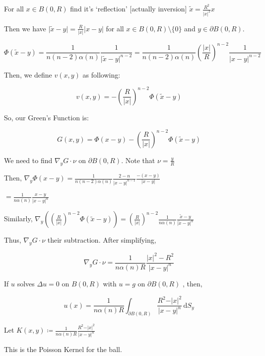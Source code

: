 \documentclass{article}
\theoremstyle{definition}
\begin{document}
For all \(x\in B(0,R)\) find it's `reflection' [actually inversion] \(\tilde{x}=\frac{R^2}{\vert x \vert ^2}x\) 

Then we have \(\vert \tilde x - y \vert = \frac{R}{\vert x \vert }\vert x-y \vert \) for all \(x\in B(0,R)\setminus \{ 0 \} \) and \(y\in \partial B(0,R)\).

\[
    \Phi(\tilde{x}-y)=\frac{1}{n(n-2)\alpha(n)}\frac{1}{\vert \tilde{x}-y \vert ^{n-2}}=\frac{1}{n(n-2)\alpha (n)}\left( \frac{\vert x \vert }{R} \right)^{n-2} \frac{1}{\vert x-y \vert ^{n-2}}
\]

Then, we define \(v(x,y)\) as following:

\[
    v(x,y)=-\left( \frac{R}{\vert x \vert } \right) ^{n-2}\Phi(\tilde x - y)
\]

So, our Green's Function is:

\[
    G(x,y)=\Phi(x-y)-\left( \frac{R}{\vert x \vert } \right)^{n-2}\Phi(\tilde x - y) 
\]

We need to find \(\nabla_y G\cdot\nu\) on \(\partial B(0,R)\). Note that \(\nu = \frac{y}{R}\) 

Then, \(\displaystyle\nabla_y\Phi(x-y)=\frac{1}{n(n-2)\alpha (n)}\frac{2-n}{\vert x-y \vert ^{n-1}}\frac{-(x-y)}{\vert x-y \vert }\) 

\(=\displaystyle \frac{1}{n \alpha (n)} \frac{x-y}{\vert x-y \vert ^n}\) 

Similarly, \(\displaystyle \nabla_y \left( \left( \frac{R}{\vert x \vert } \right) ^{n-2} \Phi(\tilde x - y) \right) = \left( \frac{R}{\vert x \vert } \right) ^{n-2} \frac{1}{n \alpha (n)}\frac{\tilde x - y}{\vert \tilde x - y \vert ^n}\)

Thus, \(\nabla_y G\cdot\nu\) their subtraction. After simplifying,

\[
    \nabla_y G\cdot\nu = \frac{1}{n \alpha (n) R} \frac{\vert x \vert ^2 - R^2}{\vert x - y \vert ^n}
\]

If \(u\) solves \(\Delta u = 0\) on \(B(0,R)\) with \(u=g\) on \(\partial B(0,R)\) , then,

\[
    u(x)= \frac{1}{n \alpha (n)R}\int_{\partial B(0,R)}^{} \frac{R^2-\vert x \vert ^2 }{\vert x - y \vert ^n} \,\mathrm{d}S_y 
\]

Let \(\displaystyle K(x,y)\coloneqq \frac{1}{n \alpha (n) R} \frac{R^2 - \vert x \vert ^2}{\vert x - y \vert ^n}\) 

This is the Poisson Kernel for the ball.
\end{document}
